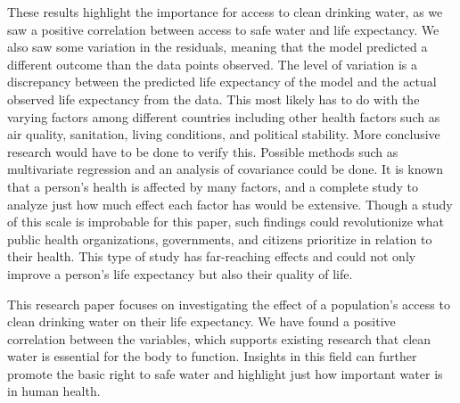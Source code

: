 \documentclass[12pt]{article}
\begin{document}
These results highlight the importance for access to clean drinking water, as we saw a positive correlation between access to safe water and life expectancy. We also saw some variation in the residuals, meaning that the model predicted a different outcome than the data points observed. The level of variation is a discrepancy between the predicted life expectancy of the model and the actual observed life expectancy from the data. This most likely has to do with the varying factors among different countries including other health factors such as air quality, sanitation, living conditions, and political stability. More conclusive research would have to be done to verify this. Possible methods such as multivariate regression and an analysis of covariance could be done. It is known that a person's health is affected by many factors, and a complete study to analyze just how much effect each factor has would be extensive. Though a study of this scale is improbable for this paper, such findings could revolutionize what public health organizations, governments, and citizens prioritize in relation to their health. This type of study has far-reaching effects and could not only improve a person's life expectancy but also their quality of life.

This research paper focuses on investigating the effect of a population's access to clean drinking water on their life expectancy. We have found a positive correlation between the variables, which supports existing research that clean water is essential for the body to function. Insights in this field can further promote the basic right to safe water and highlight just how important water is in human health.

\newpage



\end{document}
